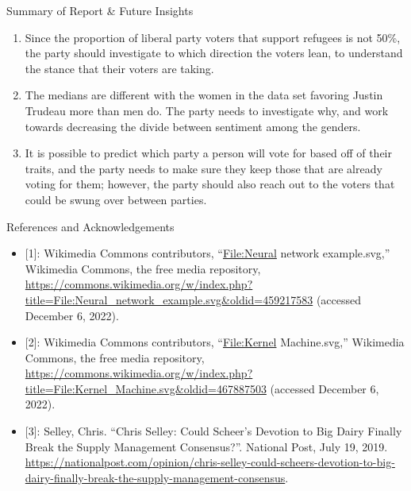 \documentclass[
  ignorenonframetext,
]{beamer}
\begin{document}
\begin{frame}{Summary of Report \& Future Insights}
\protect\hypertarget{summary-of-report-future-insights}{}

\begin{enumerate}
\item
  Since the proportion of liberal party voters that support refugees is
  not 50\%, the party should investigate to which direction the voters
  lean, to understand the stance that their voters are taking.
\item
  The medians are different with the women in the data set favoring
  Justin Trudeau more than men do. The party needs to investigate why,
  and work towards decreasing the divide between sentiment among the
  genders.
\item
  It is possible to predict which party a person will vote for based off
  of their traits, and the party needs to make sure they keep those that
  are already voting for them; however, the party should also reach out
  to the voters that could be swung over between parties.
\end{enumerate}

\end{frame}

\begin{frame}{References and Acknowledgements}
\protect\hypertarget{references-and-acknowledgements}{}

\fontsize{8}{10}\selectfont

\begin{itemize}
\item
  {[}1{]}: Wikimedia Commons contributors, ``\url{File:Neural} network
  example.svg,'' Wikimedia Commons, the free media repository,
  \url{https://commons.wikimedia.org/w/index.php?title=File:Neural_network_example.svg\&oldid=459217583}
  (accessed December 6, 2022).
\item
  {[}2{]}: Wikimedia Commons contributors, ``\url{File:Kernel}
  Machine.svg,'' Wikimedia Commons, the free media repository,
  \url{https://commons.wikimedia.org/w/index.php?title=File:Kernel_Machine.svg\&oldid=467887503}
  (accessed December 6, 2022).
\item
  {[}3{]}: Selley, Chris. ``Chris Selley: Could Scheer's Devotion to Big
  Dairy Finally Break the Supply Management Consensus?''. National Post,
  July 19, 2019.
  \url{https://nationalpost.com/opinion/chris-selley-could-scheers-devotion-to-big-dairy-finally-break-the-supply-management-consensus}.
\end{itemize}

\end{frame}
\end{document}
